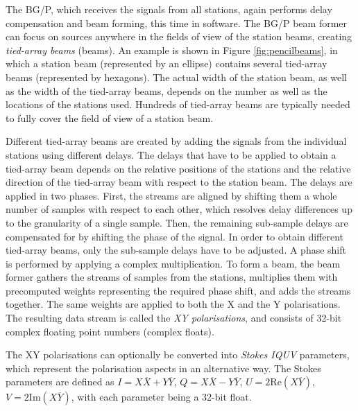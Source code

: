 \documentclass{llncs}
\begin{document}
The BG/P, which receives the signals from all stations, again performs delay compensation and beam forming, this time in software. The BG/P beam former can focus on sources anywhere in the fields of view of the station beams, creating \emph{tied-array beams} (beams). An example is shown in Figure \ref{fig:pencilbeams}, in which a station beam (represented by an ellipse) contains several tied-array beams (represented by hexagons). The actual width of the station beam, as well as the width of the tied-array beams, depends on the number as well as the locations of the stations used. Hundreds of tied-array beams are typically needed to fully cover the field of view of a station beam.

Different tied-array beams are created by adding the signals from the individual stations using different delays. The delays that have to be applied to obtain a tied-array beam depends on the relative positions of the stations and the relative direction of the tied-array beam with respect to the station beam. The delays are applied in two phases. First, the streams are aligned by shifting them a whole number of samples with respect to each other, which resolves delay differences up to the granularity of a single sample. Then, the remaining sub-sample delays are compensated for by shifting the phase of the signal. In order to obtain different tied-array beams, only the sub-sample delays have to be adjusted. A phase shift is performed by applying a complex multiplication. To form a beam, the beam former gathers the streams of samples from the stations, multiplies them with precomputed weights representing the required phase shift, and adds the streams together. The same weights are applied to both the X and the Y polarisations. The resulting data stream is called the \emph{XY polarisations}, and consists of 32-bit complex floating point numbers (complex floats).

The XY polarisations can optionally be converted into \emph{Stokes IQUV} parameters, which represent the polarisation aspects in an alternative way. The Stokes parameters are defined as $I = X\overline{X} + Y\overline{Y}$, $Q = X\overline{X} - Y\overline{Y}$, $U = 2\mathrm{Re}(X\overline{Y})$, $V = 2\mathrm{Im}(X\overline{Y})$, with each parameter being a 32-bit float.
\end{document}
